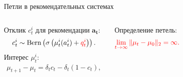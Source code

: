 \documentclass{beamer}
\begin{document}

\begin{frame}{Петли в рекомендательных системах}

\begin{columns}[c]
Отклик $c_t^i$ для рекомендации $\mathbf{a_t}$:
\begin{gather*}
    c_t^i \sim \text{Bern} \left(\sigma\left(\mu_t^i (a_t^i) + \mathbin{\color{red} q_t^i } \right) \right). 
\end{gather*}
Интерес $\mu_t^i$:
\begin{gather*}
    \mu_{t+1} - \mu_{t} = \delta_t c_t - \delta_t (1 - c_t),\\ 
\end{gather*}

Определение петель: 
\begin{gather*}
  \color{red} \lim_{t \to \infty} \|\mu_t - \mu_0 \|_2 = \infty.
\end{gather*}







\end{columns}
\end{frame}
\end{document}
